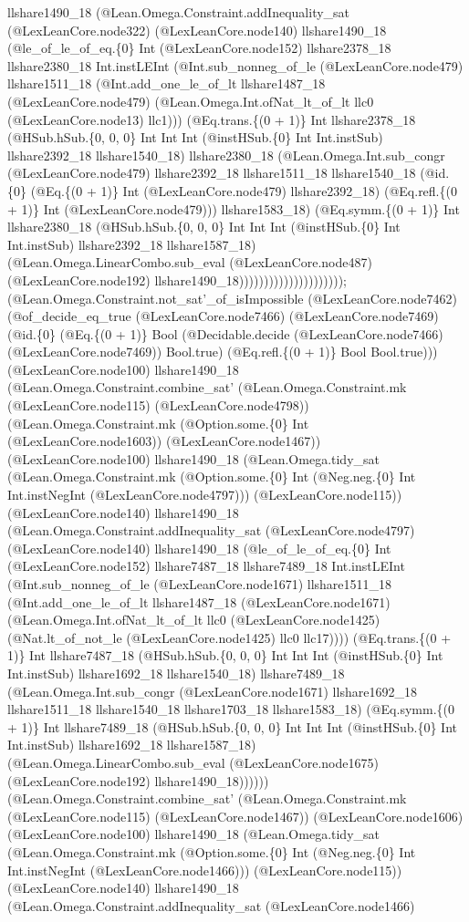 \documentclass[11pt]{article}
\begin{document}
llshare1490\_18 (@Lean.Omega.Constraint.addInequality\_sat (@LexLeanCore.node322) (@LexLeanCore.node140) llshare1490\_18 (@le\_of\_le\_of\_eq.\{0\} Int (@LexLeanCore.node152) llshare2378\_18 llshare2380\_18 Int.instLEInt (@Int.sub\_nonneg\_of\_le (@LexLeanCore.node479) llshare1511\_18 (@Int.add\_one\_le\_of\_lt llshare1487\_18 (@LexLeanCore.node479) (@Lean.Omega.Int.ofNat\_lt\_of\_lt llc0 (@LexLeanCore.node13) llc1))) (@Eq.trans.\{(0 + 1)\} Int llshare2378\_18 (@HSub.hSub.\{0, 0, 0\} Int Int Int (@instHSub.\{0\} Int Int.instSub) llshare2392\_18 llshare1540\_18) llshare2380\_18 (@Lean.Omega.Int.sub\_congr (@LexLeanCore.node479) llshare2392\_18 llshare1511\_18 llshare1540\_18 (@id.\{0\} (@Eq.\{(0 + 1)\} Int (@LexLeanCore.node479) llshare2392\_18) (@Eq.refl.\{(0 + 1)\} Int (@LexLeanCore.node479))) llshare1583\_18) (@Eq.symm.\{(0 + 1)\} Int llshare2380\_18 (@HSub.hSub.\{0, 0, 0\} Int Int Int (@instHSub.\{0\} Int Int.instSub) llshare2392\_18 llshare1587\_18) (@Lean.Omega.LinearCombo.sub\_eval (@LexLeanCore.node487) (@LexLeanCore.node192) llshare1490\_18))))))))))))))))))))); (@Lean.Omega.Constraint.not\_sat'\_of\_isImpossible (@LexLeanCore.node7462) (@of\_decide\_eq\_true (@LexLeanCore.node7466) (@LexLeanCore.node7469) (@id.\{0\} (@Eq.\{(0 + 1)\} Bool (@Decidable.decide (@LexLeanCore.node7466) (@LexLeanCore.node7469)) Bool.true) (@Eq.refl.\{(0 + 1)\} Bool Bool.true))) (@LexLeanCore.node100) llshare1490\_18 (@Lean.Omega.Constraint.combine\_sat' (@Lean.Omega.Constraint.mk (@LexLeanCore.node115) (@LexLeanCore.node4798)) (@Lean.Omega.Constraint.mk (@Option.some.\{0\} Int (@LexLeanCore.node1603)) (@LexLeanCore.node1467)) (@LexLeanCore.node100) llshare1490\_18 (@Lean.Omega.tidy\_sat (@Lean.Omega.Constraint.mk (@Option.some.\{0\} Int (@Neg.neg.\{0\} Int Int.instNegInt (@LexLeanCore.node4797))) (@LexLeanCore.node115)) (@LexLeanCore.node140) llshare1490\_18 (@Lean.Omega.Constraint.addInequality\_sat (@LexLeanCore.node4797) (@LexLeanCore.node140) llshare1490\_18 (@le\_of\_le\_of\_eq.\{0\} Int (@LexLeanCore.node152) llshare7487\_18 llshare7489\_18 Int.instLEInt (@Int.sub\_nonneg\_of\_le (@LexLeanCore.node1671) llshare1511\_18 (@Int.add\_one\_le\_of\_lt llshare1487\_18 (@LexLeanCore.node1671) (@Lean.Omega.Int.ofNat\_lt\_of\_lt llc0 (@LexLeanCore.node1425) (@Nat.lt\_of\_not\_le (@LexLeanCore.node1425) llc0 llc17)))) (@Eq.trans.\{(0 + 1)\} Int llshare7487\_18 (@HSub.hSub.\{0, 0, 0\} Int Int Int (@instHSub.\{0\} Int Int.instSub) llshare1692\_18 llshare1540\_18) llshare7489\_18 (@Lean.Omega.Int.sub\_congr (@LexLeanCore.node1671) llshare1692\_18 llshare1511\_18 llshare1540\_18 llshare1703\_18 llshare1583\_18) (@Eq.symm.\{(0 + 1)\} Int llshare7489\_18 (@HSub.hSub.\{0, 0, 0\} Int Int Int (@instHSub.\{0\} Int Int.instSub) llshare1692\_18 llshare1587\_18) (@Lean.Omega.LinearCombo.sub\_eval (@LexLeanCore.node1675) (@LexLeanCore.node192) llshare1490\_18)))))) (@Lean.Omega.Constraint.combine\_sat' (@Lean.Omega.Constraint.mk (@LexLeanCore.node115) (@LexLeanCore.node1467)) (@LexLeanCore.node1606) (@LexLeanCore.node100) llshare1490\_18 (@Lean.Omega.tidy\_sat (@Lean.Omega.Constraint.mk (@Option.some.\{0\} Int (@Neg.neg.\{0\} Int Int.instNegInt (@LexLeanCore.node1466))) (@LexLeanCore.node115)) (@LexLeanCore.node140) llshare1490\_18 (@Lean.Omega.Constraint.addInequality\_sat (@LexLeanCore.node1466) 
\end{document}
